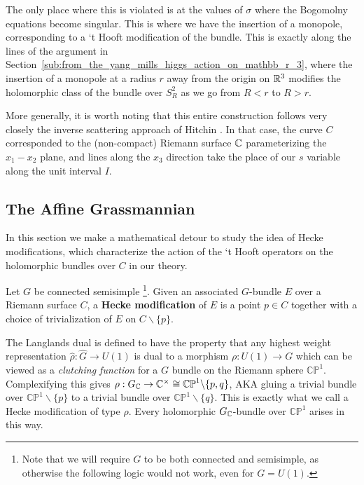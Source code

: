 	 The only place where this is violated is at the values of $\sigma$ where the Bogomolny equations become singular. This is where we have the insertion of a monopole, corresponding to a `t Hooft modification of the bundle. This is exactly along the lines of the argument in Section~\ref{sub:from_the_yang_mills_higgs_action_on_mathbb_r_3}, where the insertion of a monopole at a radius $r$ away from the origin on $\mathbb{R}^3$ modifies the holomorphic class of the bundle over $S^2_R$ as we go from $R < r$ to $R > r$. 
	 
	 
	 More generally, it is worth noting that this entire construction follows very closely the inverse scattering approach of Hitchin \cite{hitchin1982, atiyahhitchin1988}. In that case, the curve $C$ corresponded to the (non-compact) Riemann surface $\mathbb{C}$ parameterizing the $x_1-x_2$ plane, and lines along the $x_3$ direction take the place of our $s$ variable along the unit interval $I$.
	
	\subsection{The Affine Grassmannian}

	In this section we make a mathematical detour to study the idea of Hecke modifications, which characterize the action of the `t Hooft operators on the holomorphic bundles over $C$ in our theory.
	
	\begin{defn}
		Let $G$ be connected semisimple \footnote{Note that we will require $G$ to be both connected and semisimple, as otherwise the following logic would not work, even for $G=U(1)$.}. Given an associated $G$-bundle $E$ over a Riemann surface $C$, a \textbf{Hecke modification} of $E$ is a point $p \in C$ together with a choice of trivialization of $E$ on $C \backslash \{p \}$.
	\end{defn}
	
	
	\begin{obs}\label{obs:hecke}
			The Langlands dual is defined to have the property that any highest weight representation $\hat \rho: \hat G \to U(1)$ is dual to a morphism $\rho: U(1) \to G$ which can be viewed as a \emph{clutching function} for a $G$ bundle on the Riemann sphere $\mathbb{CP}^1$. Complexifying this gives $\rho: G_{\mathbb{C}} \to \mathbb{C}^\times \cong \mathbb{CP}^1 \backslash \{p, q \}$, AKA gluing a trivial bundle over $\mathbb{CP}^1 \backslash \{p \}$ to a trivial bundle over $\mathbb{CP}^1 \backslash \{q \}$. This is exactly what we call a Hecke modification of type $\rho$. Every holomorphic $G_{\mathbb{C}}$-bundle over $\mathbb{CP}^1$ arises in this way.
	\end{obs}

